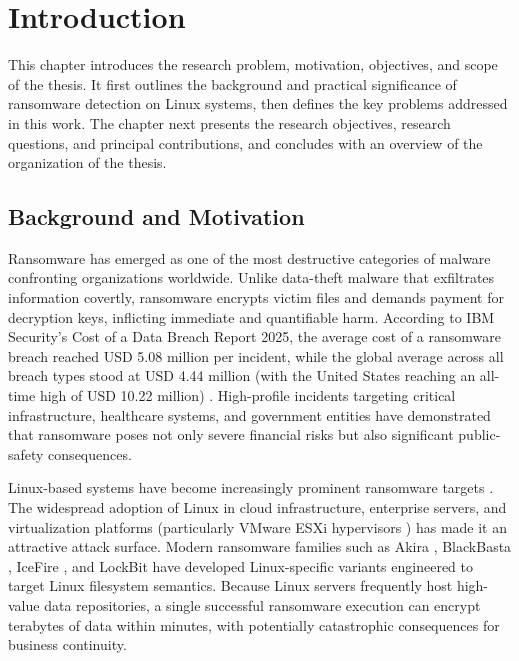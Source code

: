 \chapter{Introduction}\label{chap:1}

This chapter introduces the research problem, motivation, objectives, and scope of the thesis. It first outlines the background and practical significance of ransomware detection on Linux systems, then defines the key problems addressed in this work. The chapter next presents the research objectives, research questions, and principal contributions, and concludes with an overview of the organization of the thesis.

\section{Background and Motivation}\label{sec:1.1}

Ransomware has emerged as one of the most destructive categories of malware confronting organizations worldwide. Unlike data-theft malware that exfiltrates information covertly, ransomware encrypts victim files and demands payment for decryption keys, inflicting immediate and quantifiable harm. According to IBM Security's Cost of a Data Breach Report 2025, the average cost of a ransomware breach reached USD 5.08 million per incident, while the global average across all breach types stood at USD 4.44 million (with the United States reaching an all-time high of USD 10.22 million) \cite{ref1}. High-profile incidents targeting critical infrastructure, healthcare systems, and government entities have demonstrated that ransomware poses not only severe financial risks but also significant public-safety consequences.

Linux-based systems have become increasingly prominent ransomware targets \cite{ref2}. The widespread adoption of Linux in cloud infrastructure, enterprise servers, and virtualization platforms (particularly VMware ESXi hypervisors \cite{ref3}) has made it an attractive attack surface. Modern ransomware families such as Akira \cite{ref4}, BlackBasta \cite{ref5}, IceFire \cite{ref6}, and LockBit \cite{ref7} have developed Linux-specific variants engineered to target Linux filesystem semantics. Because Linux servers frequently host high-value data repositories, a single successful ransomware execution can encrypt terabytes of data within minutes, with potentially catastrophic consequences for business continuity.

